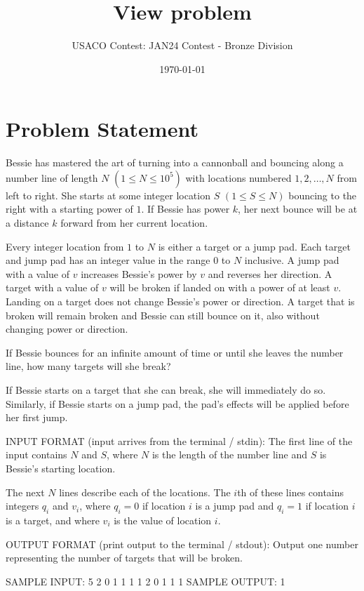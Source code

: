\documentclass[12pt]{article}
\title{View problem}
\author{USACO Contest: JAN24 Contest - Bronze Division}
\date{\today}
\begin{document}
\maketitle

\section*{Problem Statement}


Bessie has mastered the art of turning into a cannonball and bouncing along a
number line of length $N$  $(1 \leq N \leq 10^5)$ with locations numbered
$1,2,\dots,N$ from left to right.  She starts at some integer location $S$
$(1 \leq S \leq N)$ bouncing to the right with a starting power of $1$. If
Bessie has power $k$, her next bounce will be at a distance $k$ forward from her
current location.  

Every integer location from $1$ to $N$ is either a target or a jump pad. Each
target and jump pad has an integer value in the range $0$ to $N$ inclusive. A
jump pad with a value of $v$ increases Bessie's power by $v$ and reverses her
direction.  A target with a value of $v$ will be broken if landed on with a
power of at least $v$.  Landing on a target does not change Bessie's power or
direction.  A target that is broken will remain broken and Bessie can still
bounce on it, also without changing power or direction.

If Bessie bounces for an infinite amount of time or until she leaves the number
line, how many targets will she break?

If Bessie starts on a target that she can break, she will immediately do so.
Similarly, if Bessie starts on a jump pad, the pad's effects will be applied
before her first jump.

INPUT FORMAT (input arrives from the terminal / stdin):
The first line of the input contains $N$ and $S$, where $N$ is the length of the
number line and $S$ is Bessie's starting location.

The next $N$ lines describe each of the locations. The $i$th of these lines
contains integers $q_i$ and $v_i$, where $q_i = 0$ if location $i$ is a jump pad
and  $q_i = 1$ if location $i$ is a target, and where $v_i$ is the value of
location $i$.

OUTPUT FORMAT (print output to the terminal / stdout):
Output one number representing the number of targets that will be broken.

SAMPLE INPUT:
5 2
0 1
1 1
1 2
0 1
1 1
SAMPLE OUTPUT: 
1
\end{document}
